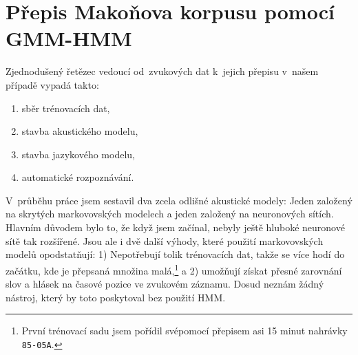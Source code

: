 \section{Přepis Makoňova korpusu pomocí GMM-HMM}




Zjednodušený řetězec vedoucí od~zvukových dat k~jejich přepisu v~našem případě
vypadá takto:\begin{enumerate}
\item{sběr trénovacích dat,}
\item{stavba akustického modelu,}
\item{stavba jazykového modelu,}
\item{automatické rozpoznávání.}
\end{enumerate}


V~průběhu práce jsem sestavil dva zcela odlišné akustické modely: Jeden založený
na skrytých markovovských modelech a jeden založený na neuronových sítích.
Hlavním důvodem bylo to, že když jsem začínal, nebyly ještě hluboké neuronové
sítě tak rozšířené. Jsou ale i dvě další výhody, které použití markovovských
modelů opodstatňují: 1) Nepotřebují tolik trénovacích dat, takže se více hodí do
začátku, kde je přepsaná množina malá,\footnote{První trénovací sadu jsem pořídil svépomocí přepisem asi 15 minut nahrávky
\texttt{85-05A}.} a 2) umožňují získat přesné zarovnání
slov a hlásek na časové pozice ve zvukovém záznamu. Dosud neznám žádný nástroj,
který by toto poskytoval bez použití HMM.

